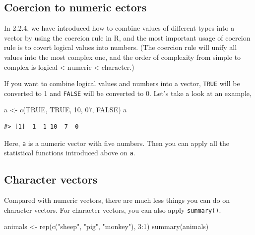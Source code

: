 \documentclass[
]{book}
\newenvironment{Shaded}{\begin{snugshade}}{\end{snugshade}}
\newcommand{\ConstantTok}[1]{\textcolor[rgb]{0.00,0.00,0.00}{#1}}
\newcommand{\DecValTok}[1]{\textcolor[rgb]{0.00,0.00,0.81}{#1}}
\newcommand{\FunctionTok}[1]{\textcolor[rgb]{0.00,0.00,0.00}{#1}}
\newcommand{\NormalTok}[1]{#1}
\newcommand{\OtherTok}[1]{\textcolor[rgb]{0.56,0.35,0.01}{#1}}
\newcommand{\SpecialCharTok}[1]{\textcolor[rgb]{0.00,0.00,0.00}{#1}}
\newcommand{\StringTok}[1]{\textcolor[rgb]{0.31,0.60,0.02}{#1}}
\begin{document}
\hypertarget{coercion-to-numeric-ectors}{%
\subsection{Coercion to numeric ectors}\label{coercion-to-numeric-ectors}}

In 2.2.4, we have introduced how to combine values of different types into a vector by using the coercion rule in R, and the most important usage of coercion rule is to covert logical values into numbers. (The coercion rule will unify all values into the most complex one, and the order of complexity from simple to complex is logical \textless{} numeric \textless{} character.)

If you want to combine logical values and numbers into a vector, \texttt{TRUE} will be converted to 1 and \texttt{FALSE} will be converted to 0. Let's take a look at an example,

\begin{Shaded}
\begin{Highlighting}[]
\NormalTok{a }\OtherTok{\textless{}{-}} \FunctionTok{c}\NormalTok{(}\ConstantTok{TRUE}\NormalTok{, }\ConstantTok{TRUE}\NormalTok{, }\DecValTok{10}\NormalTok{, }\DecValTok{07}\NormalTok{, }\ConstantTok{FALSE}\NormalTok{)}
\NormalTok{a}
\end{Highlighting}
\end{Shaded}

\begin{verbatim}
#> [1]  1  1 10  7  0
\end{verbatim}

Here, \texttt{a} is a numeric vector with five numbers. Then you can apply all the statistical functions introduced above on \texttt{a}.

\hypertarget{character-vectors-1}{%
\subsection{Character vectors}\label{character-vectors-1}}

Compared with numeric vectors, there are much less things you can do on character vectors. For character vectors, you can also apply \texttt{summary()}.

\begin{Shaded}
\begin{Highlighting}[]
\NormalTok{animals }\OtherTok{\textless{}{-}} \FunctionTok{rep}\NormalTok{(}\FunctionTok{c}\NormalTok{(}\StringTok{"sheep"}\NormalTok{, }\StringTok{"pig"}\NormalTok{, }\StringTok{"monkey"}\NormalTok{), }\DecValTok{3}\SpecialCharTok{:}\DecValTok{1}\NormalTok{)}
\FunctionTok{summary}\NormalTok{(animals)}
\end{Highlighting}
\end{Shaded}
\end{document}
